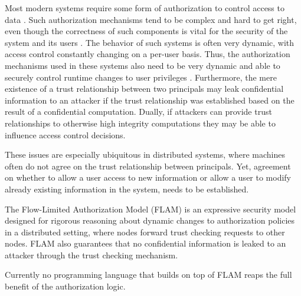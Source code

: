 Most modern systems require some form of authorization to control access to data \cite{Menezes:1996:HAC:548089}. Such authorization mechanisms tend to be complex and hard to get right, even though the correctness of such components is vital for the security of the system and its users \cite{Ferraiolo:1999:RAC:300830.300834}. 
The behavior of such systems is often very dynamic, with access control constantly changing on a per-user basis. Thus, the authorization mechanisms used in these systems also need to be very dynamic and able to securely control runtime changes to user privileges \cite{Ferraiolo:1999:RAC:300830.300834}. Furthermore, the mere existence of a trust relationship between two principals may leak confidential information to an attacker if the trust relationship was established based on the result of a confidential computation. Dually, if attackers can provide trust relationships to otherwise high integrity computations they may be able to influence access control decisions.

These issues are especially ubiquitous in distributed systems, where machines often do not agree on the trust relationship between principals. Yet, agreement on whether to allow a user access to new information or allow a user to modify already existing information in the system, needs to be established.

The Flow-Limited Authorization Model (FLAM) \cite{Arden:2015:FA:2859845.2859998} is an expressive security model designed for rigorous reasoning about dynamic changes to authorization policies in a distributed setting, where nodes forward trust checking requests to other nodes. FLAM also guarantees that no confidential information is leaked to an attacker through the trust checking mechanism. 

Currently no programming language that builds on top of FLAM reaps the full benefit of the authorization logic.




